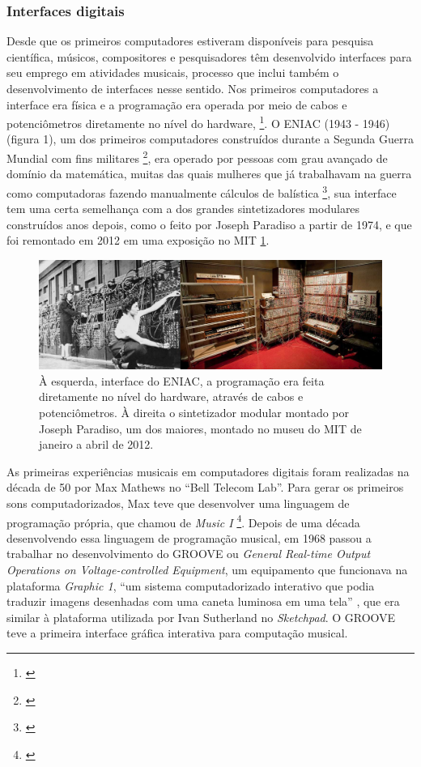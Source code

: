 \subsubsection{Interfaces digitais}

Desde que os primeiros computadores estiveram disponíveis para pesquisa científica, músicos, compositores e pesquisadores têm desenvolvido interfaces para seu emprego em atividades musicais, processo que inclui também o desenvolvimento de interfaces nesse sentido. Nos primeiros computadores a interface era física e a programação era operada por meio de cabos e potenciômetros diretamente no nível do hardware, \footnote{\cite[110]{Henrique1996}}. O ENIAC (1943 - 1946) (figura 1), um dos primeiros computadores construídos durante a Segunda Guerra Mundial com fins militares \footnote{\cite[24]{Stolfi}}, era operado por pessoas com grau avançado de domínio da matemática, muitas das quais mulheres que já trabalhavam na guerra como computadoras fazendo manualmente cálculos de balística \footnote{\cite{HayleyWilliams2015}}, sua interface tem uma certa semelhança com a dos grandes sintetizadores modulares construídos anos depois, como o feito por Joseph Paradiso a partir de 1974, e que foi remontado em 2012 em uma exposição no MIT \ref{analogicos}. 

\begin{figure}
    \caption{\label{analogicos}À esquerda, interface do ENIAC, a programação era feita diretamente no nível do hardware, através de cabos e potenciômetros.  À direita o sintetizador modular montado por Joseph Paradiso, um dos maiores, montado no museu do MIT de janeiro a abril de 2012.}
    
        \includegraphics[width=1\linewidth]{pictures/analogicos}
    
\end{figure}

As primeiras experiências musicais em computadores digitais foram realizadas na década de 50 por Max Mathews no ``Bell Telecom Lab''. Para gerar os primeiros sons computadorizados, Max teve que desenvolver uma linguagem de programação própria, que chamou de \emph{Music I} \footnote{\cite[253]{Holmes1985}}. Depois de uma década desenvolvendo essa linguagem de programação musical, em 1968 passou a trabalhar no desenvolvimento do GROOVE ou \emph{General Real-time Output Operations on Voltage-controlled Equipment}, um equipamento que funcionava na plataforma \emph{Graphic 1}, ``um sistema computadorizado interativo que podia traduzir imagens desenhadas com uma caneta luminosa em uma tela'' \cite[253]{Holmes1985}, que era similar à plataforma utilizada por Ivan Sutherland no \emph{Sketchpad}. O GROOVE teve a primeira interface gráfica interativa para computação musical. 

